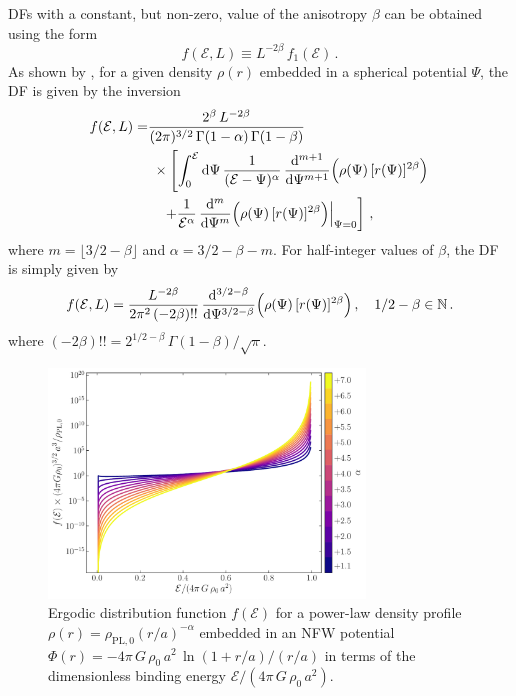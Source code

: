 DFs with a constant, but non-zero, value of the anisotropy $\beta$ can be obtained using the form
\begin{equation}\label{ch2:eq-constantbetadf-form}
    f(\mathcal{E},L) \equiv L^{-2\beta}\,f_1(\mathcal{E})\,.
\end{equation}
As shown by \textcite{cuddeford91} \parencite[see also][for a clearer statement of this result]{an06}, for a given density $\rho(r)$ embedded in a spherical potential $\Psi$, the DF is given by the inversion 
\begin{equation}\label{ch2:eq-anidf-constbeta-generalsol}
\begin{split}
    f(\mathcal{E},L) =  & {2^\beta\,L^{-2\beta} \over (2\pi)^{3/2}\,\Gamma(1-\alpha)\,\Gamma(1-\beta)}\\&\ \times \left[\int_0^\mathcal{E}\mathrm{d}\Psi\,{1\over (\mathcal{E}-\Psi)^\alpha}\,{\mathrm{d}^{m+1} \over \mathrm{d} \Psi^{m+1}}\Big(\rho(\Psi)\,[r(\Psi)]^{2\beta}\Big)\right.\\& \quad \left. +{1\over \mathcal{E}^\alpha}\,{\mathrm{d}^{m} \over \mathrm{d} \Psi^{m}}\Big(\rho(\Psi)\,[r(\Psi)]^{2\beta}\Big)\Big|_{\Psi=0}\right]\,,
\end{split}
\end{equation}
where $m = \lfloor 3/2-\beta \rfloor$ and $\alpha = 3/2-\beta-m$. For half-integer values of $\beta$, the DF is simply given by
\begin{equation}\label{ch2:eq-anidf-constbeta-halfinteger}
    f(\mathcal{E},L) = {L^{-2\beta} \over 2\pi^2\,(-2\beta)!!}\,{\mathrm{d}^{3/2-\beta} \over \mathrm{d} \Psi^{3/2-\beta}}\Big(\rho(\Psi)\,[r(\Psi)]^{2\beta}\Big)\,,\quad 1/2-\beta \in \mathbb{N}\,.
\end{equation}
where $(-2\beta)!! = 2^{1/2-\beta}\,\Gamma(1-\beta)/\sqrt{\pi}$.

\begin{figure}
	\centering
	\includegraphics[width=0.75\textwidth]{figure/ch2/pl_in_nfw.pdf}
	\caption{Ergodic distribution function $f(\mathcal{E})$ for a power-law density profile $\rho(r) = \rho_{\mathrm{PL},0} (r/a)^{-\alpha}$ embedded in an NFW potential $\Phi(r) = -4\pi\,G\,\rho_0\,a^2\,\ln(1+r/a)/(r/a)$ in terms of the dimensionless binding energy $\mathcal{E}/(4\pi\,G\,\rho_0\,a^2)$.}
	\label{ch2:fig:pl_in_nfw}
\end{figure}

